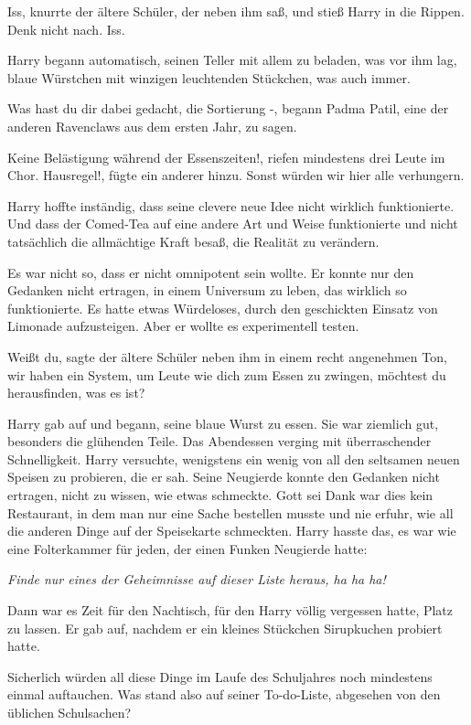 \glqq{}Iss\grqq{}, knurrte der ältere Schüler, der neben ihm saß, und stieß
Harry in die Rippen. \glqq{}Denk nicht nach. Iss.\grqq{}

Harry begann automatisch, seinen Teller mit allem zu beladen, was vor ihm lag,
blaue Würstchen mit winzigen leuchtenden Stückchen, was auch immer.

\glqq{}Was hast du dir dabei gedacht, die Sortierung -\grqq{}, begann Padma
Patil, eine der anderen Ravenclaws aus dem ersten Jahr, zu sagen.

\glqq{}Keine Belästigung während der Essenszeiten!\grqq{}, riefen mindestens
drei Leute im Chor. \glqq{}Hausregel!\grqq{}, fügte ein anderer hinzu.
\glqq{}Sonst würden wir hier alle verhungern.\grqq{}

Harry hoffte inständig, dass seine clevere neue Idee nicht wirklich
funktionierte. Und dass der Comed-Tea auf eine andere Art und Weise
funktionierte und nicht tatsächlich die allmächtige Kraft besaß, die Realität zu
verändern.

Es war nicht so, dass er nicht omnipotent sein wollte. Er konnte nur den
Gedanken nicht ertragen, in einem Universum zu leben, das wirklich so
funktionierte. Es hatte etwas Würdeloses, durch den geschickten Einsatz von
Limonade aufzusteigen. Aber er wollte es experimentell testen.

\glqq{}Weißt du\grqq{}, sagte der ältere Schüler neben ihm in einem recht
angenehmen Ton, \glqq{}wir haben ein System, um Leute wie dich zum Essen zu
zwingen, möchtest du herausfinden, was es ist?\grqq{}

Harry gab auf und begann, seine blaue Wurst zu essen. Sie war ziemlich gut,
besonders die glühenden Teile. Das Abendessen verging mit überraschender
Schnelligkeit. Harry versuchte, wenigstens ein wenig von all den seltsamen neuen
Speisen zu probieren, die er sah. Seine Neugierde konnte den Gedanken nicht
ertragen, nicht zu wissen, wie etwas schmeckte. Gott sei Dank war dies kein
Restaurant, in dem man nur eine Sache bestellen musste und nie erfuhr, wie all
die anderen Dinge auf der Speisekarte schmeckten. Harry hasste das, es war wie
eine Folterkammer für jeden, der einen Funken Neugierde hatte:

\emph{Finde nur eines der Geheimnisse auf dieser Liste heraus, ha ha ha!}

Dann war es Zeit für den Nachtisch, für den Harry völlig vergessen hatte, Platz
zu lassen. Er gab auf, nachdem er ein kleines Stückchen Sirupkuchen probiert
hatte.

Sicherlich würden all diese Dinge im Laufe des Schuljahres noch mindestens
einmal auftauchen. Was stand also auf seiner To-do-Liste, abgesehen von den
üblichen Schulsachen?

